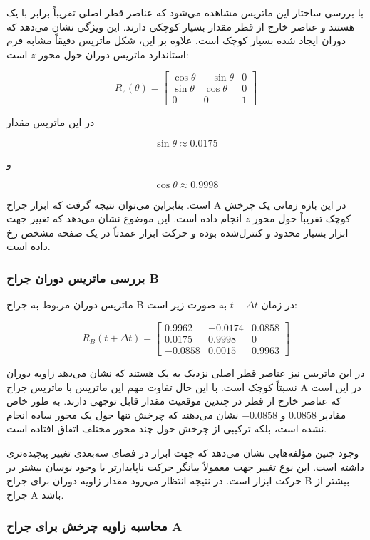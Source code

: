 \documentclass{article}
\begin{document}
با بررسی ساختار این ماتریس مشاهده می‌شود که عناصر قطر اصلی تقریباً برابر با یک هستند و عناصر خارج از قطر مقدار بسیار کوچکی دارند. این ویژگی نشان می‌دهد که دوران ایجاد شده بسیار کوچک است. علاوه بر این، شکل ماتریس دقیقاً مشابه فرم استاندارد ماتریس دوران حول محور $z$ است:

\[
R_z(\theta)=
\begin{bmatrix}
	\cos\theta & -\sin\theta & 0\\
	\sin\theta & \cos\theta & 0\\
	0 & 0 & 1
\end{bmatrix}
\]

در این ماتریس مقدار

\[
\sin\theta \approx 0.0175
\]

و

\[
\cos\theta \approx 0.9998
\]

است. بنابراین می‌توان نتیجه گرفت که ابزار جراح A در این بازه زمانی یک چرخش کوچک تقریباً حول محور $z$ انجام داده است. این موضوع نشان می‌دهد که تغییر جهت ابزار بسیار محدود و کنترل‌شده بوده و حرکت ابزار عمدتاً در یک صفحه مشخص رخ داده است.

\subsubsection{بررسی ماتریس دوران جراح B}

ماتریس دوران مربوط به جراح B در زمان $t+\Delta t$ به صورت زیر است:

\[
R_B(t+\Delta t)=
\begin{bmatrix}
	0.9962 & -0.0174 & 0.0858\\
	0.0175 & 0.9998 & 0\\
	-0.0858 & 0.0015 & 0.9963
\end{bmatrix}
\]

در این ماتریس نیز عناصر قطر اصلی نزدیک به یک هستند که نشان می‌دهد زاویه دوران نسبتاً کوچک است. با این حال تفاوت مهم این ماتریس با ماتریس جراح A در این است که عناصر خارج از قطر در چندین موقعیت مقدار قابل توجهی دارند. به طور خاص مقادیر $0.0858$ و $-0.0858$ نشان می‌دهند که چرخش تنها حول یک محور ساده انجام نشده است، بلکه ترکیبی از چرخش حول چند محور مختلف اتفاق افتاده است.

وجود چنین مؤلفه‌هایی نشان می‌دهد که جهت ابزار در فضای سه‌بعدی تغییر پیچیده‌تری داشته است. این نوع تغییر جهت معمولاً بیانگر حرکت ناپایدارتر یا وجود نوسان بیشتر در حرکت ابزار است. در نتیجه انتظار می‌رود مقدار زاویه دوران برای جراح B بیشتر از جراح A باشد.

\subsubsection{محاسبه زاویه چرخش برای جراح A}
\end{document}
